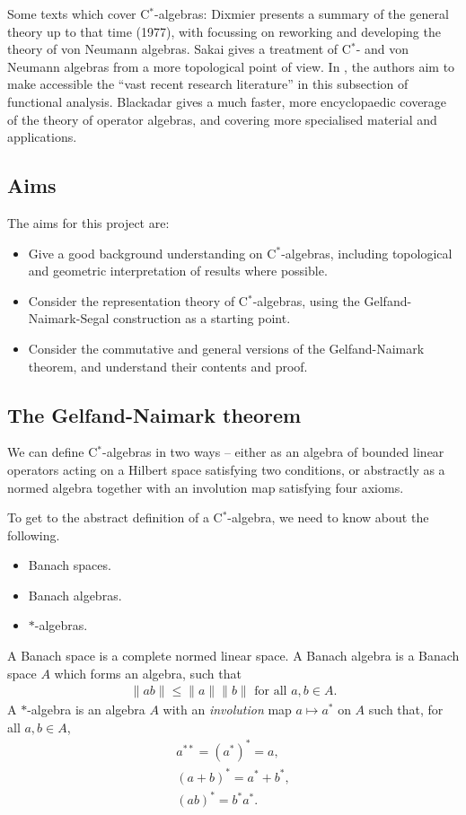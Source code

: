 \documentclass[12pt,a4paper]{amsart}
\theoremstyle{plain}
\theoremstyle{definition}
\begin{document}
	Some texts which cover C$^\ast$-algebras: 
	Dixmier \cite{dixmier77} presents a summary of the general theory up to that time (1977), with \cite{dixmier81} focussing on reworking and developing the theory of von Neumann algebras. 
	Sakai \cite{sakai71} gives a treatment of C$^\ast$- and von Neumann algebras from a more topological point of view.
	In \cite{kadison83,kadison86}, the authors aim to make accessible the ``vast recent research literature'' in this subsection of functional analysis.
	Blackadar \cite{blackadar06} gives a much faster, more encyclopaedic coverage of the theory of operator algebras, and covering more specialised material and applications.
	

\subsection{Aims}
The aims for this project are:
\begin{itemize}
	\item Give a good background understanding on C$^\ast$-algebras, including topological and geometric interpretation of results where possible.
	\item Consider the representation theory of C$^\ast$-algebras, using the Gelfand-Naimark-Segal construction as a starting point.
	\item Consider the commutative and general versions of the Gelfand-Naimark theorem, and understand their contents and proof.
\end{itemize}
	
\subsection{The Gelfand-Naimark theorem}


We can define C$^\ast$-algebras in two ways -- either as an algebra of bounded linear operators acting on a Hilbert space satisfying two conditions, or abstractly as a normed algebra together with an involution map satisfying four axioms.

	To get to the abstract definition of a C$^\ast$-algebra, we need to know about the following.
\begin{itemize}
	\item Banach spaces.
	\item Banach algebras.
	\item $\ast$-algebras.
\end{itemize}

A Banach space is a complete normed linear space. 
A Banach algebra is a Banach space $A$ which forms an algebra, such that 
\begin{align*}
	\|ab\| \leq \|a\| \|b\| \mbox{ for all } a,b \in A.
\end{align*}
A $\ast$-algebra is an algebra $A$ with an \emph{involution} map $a \mapsto a^\ast$ on $A$ such that, for all $a,b \in A$,
\begin{align*}
	 a^{\ast\ast} = (a^\ast)^\ast = a,\\
	(a+b)^\ast = a^\ast + b^\ast,\\	
	(ab)^\ast = b^\ast a^\ast.
\end{align*}
\end{document}
